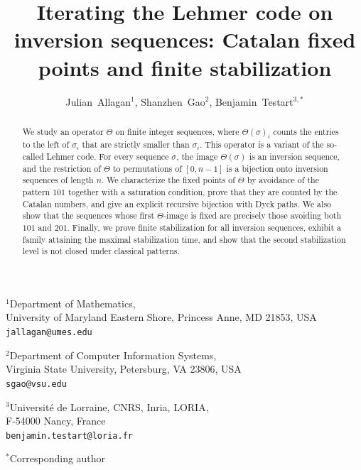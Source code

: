 \documentclass[11pt]{article}
\title{\textbf{Iterating the Lehmer code on inversion sequences: Catalan fixed points and finite stabilization}}
\author{
Julian~Allagan$^{1}$,
Shanzhen~Gao$^{2}$,
Benjamin~Testart$^{3,*}$
}
\date{}
\theoremstyle{remark}
\theoremstyle{definition}
\begin{document}
\maketitle

\begin{center}
\small

$^{1}$Department of Mathematics,\\
University of Maryland Eastern Shore, Princess Anne, MD 21853, USA\\
\texttt{jallagan@umes.edu}

\vspace{4pt}

$^{2}$Department of Computer Information Systems,\\
Virginia State University, Petersburg, VA 23806, USA\\
\texttt{sgao@vsu.edu}

\vspace{4pt}

$^{3}$Universit\'e de Lorraine, CNRS, Inria, LORIA,\\
F-54000 Nancy, France\\
\texttt{benjamin.testart@loria.fr}

\vspace{6pt}

$^{*}$Corresponding author

\end{center}

\begin{abstract}
We study an operator $\Theta$ on finite integer sequences, where $\Theta(\sigma)_i$ counts the entries to the left of $\sigma_i$ that are strictly smaller than $\sigma_i$. This operator is a variant of the so-called Lehmer code. For every sequence $\sigma$, the image $\Theta(\sigma)$ is an inversion sequence, and the restriction of $\Theta$ to permutations of $[0,n-1]$ is a bijection onto inversion sequences of length $n$. We characterize the fixed points of $\Theta$ by avoidance of the pattern $101$ together with a saturation condition, prove that they are counted by the Catalan numbers, and give an explicit recursive bijection with Dyck paths. We also show that the sequences whose first $\Theta$-image is fixed are precisely those avoiding both $101$ and $201$. Finally, we prove finite stabilization for all inversion sequences, exhibit a family attaining the maximal stabilization time, and show that the second stabilization level is not closed under classical patterns.
\end{abstract}
\end{document}
